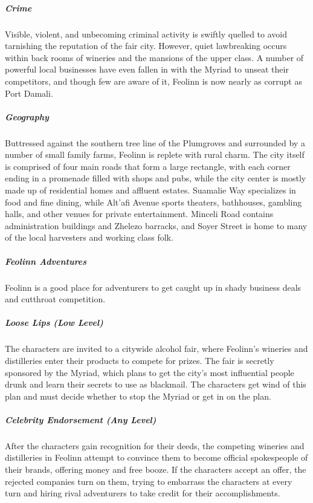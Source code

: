 \documentclass[10pt,a4paper,twoside,bg=print,twocolumn,openany,nodeprecatedcode]{dndbook}
\begin{document}
\subparagraph{Crime}
Visible, violent, and unbecoming criminal activity is swiftly quelled to avoid tarnishing the reputation of the fair city. However, quiet lawbreaking occurs within back rooms of wineries and the mansions of the upper class. A number of powerful local businesses have even fallen in with the Myriad to unseat their competitors, and though few are aware of it, Feolinn is now nearly as corrupt as Port Damali.

\subparagraph{Geography}
Buttressed against the southern tree line of the Plumgroves and surrounded by a number of small family farms, Feolinn is replete with rural charm. The city itself is comprised of four main roads that form a large rectangle, with each corner ending in a promenade filled with shops and pubs, while the city center is mostly made up of residential homes and affluent estates. Suamalie Way specializes in food and fine dining, while Alt'afi Avenue sports theaters, bathhouses, gambling halls, and other venues for private entertainment. Minceli Road contains administration buildings and Zhelezo barracks, and Soyer Street is home to many of the local harvesters and working class folk.

\subparagraph{Feolinn Adventures}
Feolinn is a good place for adventurers to get caught up in shady business deals and cutthroat competition.

\subparagraph{Loose Lips (Low Level)}
The characters are invited to a citywide alcohol fair, where Feolinn's wineries and distilleries enter their products to compete for prizes. The fair is secretly sponsored by the Myriad, which plans to get the city's most influential people drunk and learn their secrets to use as blackmail. The characters get wind of this plan and must decide whether to stop the Myriad or get in on the plan.

\subparagraph{Celebrity Endorsement (Any Level)}
After the characters gain recognition for their deeds, the competing wineries and distilleries in Feolinn attempt to convince them to become official spokespeople of their brands, offering money and free booze. If the characters accept an offer, the rejected companies turn on them, trying to embarrass the characters at every turn and hiring rival adventurers to take credit for their accomplishments.
\end{document}
